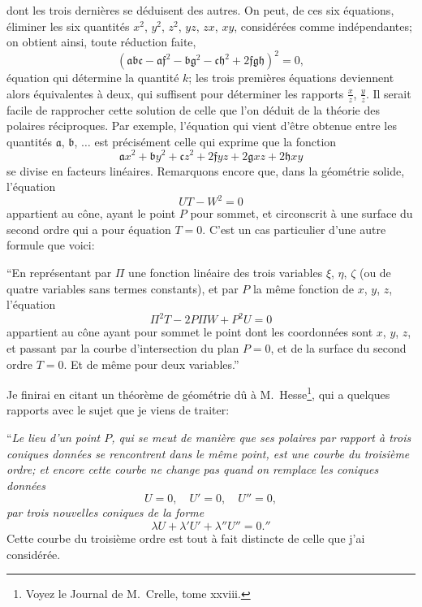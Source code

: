 \documentclass[12pt,a4paper]{article}
\providecommand{\fla}{\mathfrak{a}}
\providecommand{\flb}{\mathfrak{b}}
\providecommand{\flc}{\mathfrak{c}}
\providecommand{\flf}{\mathfrak{f}}
\providecommand{\flg}{\mathfrak{g}}
\providecommand{\flh}{\mathfrak{h}}
\begin{document}
\newpage
\setcounter{page}{194}

dont les trois derni\`eres se d\'eduisent des autres. On peut, de ces six \'equations, \'eliminer les six quantit\'es $x^2$, $y^2$, $z^2$, $yz$, $zx$, $xy$, consid\'er\'ees comme ind\'ependantes; on obtient ainsi, toute r\'eduction faite,
\[
(\fla\flb\flc - \fla\flf^2 - \flb\flg^2 - \flc\flh^2 + 2\flf\flg\flh)^2 = 0,
\]
\'equation qui d\'etermine la quantit\'e $k$; les trois premi\`eres \'equations deviennent alors \'equivalentes \`a deux, qui suffisent pour d\'eterminer les rapports $\tfrac{x}{z}$, $\tfrac{y}{z}$. Il serait facile de rapprocher cette solution de celle que l'on d\'eduit de la th\'eorie des polaires r\'eciproques. Par exemple, l'\'equation qui vient d'\^etre obtenue entre les quantit\'es $\fla$, $\flb$, $\ldots$ est pr\'ecis\'ement celle qui exprime que la fonction
\[
\fla x^2 + \flb y^2 + \flc z^2 + 2\flf yz + 2\flg xz + 2\flh xy
\]
se divise en facteurs lin\'eaires. Remarquons encore que, dans la g\'eom\'etrie solide, l'\'equation
\[
UT - W^2 = 0
\]
appartient au c\^one, ayant le point $P$ pour sommet, et circonscrit \`a une surface du second ordre qui a pour \'equation $T = 0$. C'est un cas particulier d'une autre formule que voici:

``En repr\'esentant par $\Pi$ une fonction lin\'eaire des trois variables $\xi$, $\eta$, $\zeta$ (ou de quatre variables sans termes constants), et par $P$ la m\^eme fonction de $x$, $y$, $z$, l'\'equation
\[
\Pi^2 T - 2P\Pi W + P^2 U = 0
\]
appartient au c\^one ayant pour sommet le point dont les coordonn\'ees sont $x$, $y$, $z$, et passant par la courbe d'intersection du plan $P = 0$, et de la surface du second ordre $T = 0$. Et de m\^eme pour deux variables.''

Je finirai en citant un th\'eor\`eme de g\'eom\'etrie d\^u \`a M.~Hesse\footnote{Voyez le Journal de M.~Crelle, tome xxviii.}, qui a quelques rapports avec le sujet que je viens de traiter:

``\textit{Le lieu d'un point $P$, qui se meut de mani\`ere que ses polaires par rapport \`a trois coniques donn\'ees se rencontrent dans le m\^eme point, est une courbe du troisi\`eme ordre; et encore cette courbe ne change pas quand on remplace les coniques donn\'ees
\[
U = 0,\quad U' = 0,\quad U'' = 0,
\]
par trois nouvelles coniques de la forme}
\[
\lambda U + \lambda' U' + \lambda'' U'' = 0.''
\]
Cette courbe du troisi\`eme ordre est tout \`a fait distincte de celle que j'ai consid\'er\'ee.
\end{document}
